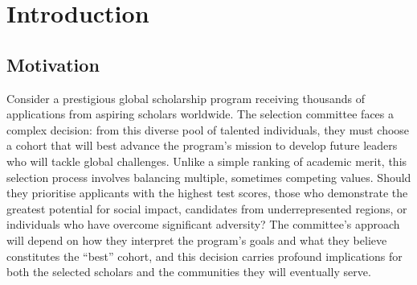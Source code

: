 \chapter{\label{ch:intro}Introduction} 


\minitoc

\section{Motivation}


Consider a prestigious global scholarship program receiving thousands of applications from aspiring scholars worldwide. The selection committee faces a complex decision: from this diverse pool of talented individuals, they must choose a cohort that will best advance the program's mission to develop future leaders who will tackle global challenges. Unlike a simple ranking of academic merit, this selection process involves balancing multiple, sometimes competing values. Should they prioritise applicants with the highest test scores, those who demonstrate the greatest potential for social impact, candidates from underrepresented regions, or individuals who have overcome significant adversity? The committee's approach will depend on how they interpret the program's goals and what they believe constitutes the ``best'' cohort, and this decision carries profound implications for both the selected scholars and the communities they will eventually serve.

